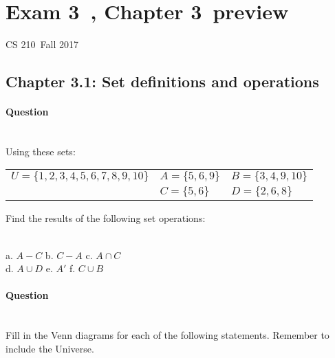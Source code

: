 \documentclass[a4paper,12pt]{book} \usepackage[utf8]{inputenc} \title{} \author{Rachel Morris} \date{\today}
\newcommand{\laClass}{CS 210\ } \newcommand{\laSemester}{Fall 2017\ }
\newcommand{\laChapter}{Chapter 3\ } \newcommand{\laExam}{Exam 3\ }
\newcounter{question}
\begin{document}
    \section*{\laExam, \laChapter preview}

    \laClass \laSemester{}

    \subsection*{Chapter 3.1: Set definitions and operations}

    \paragraph{Question \thequestion} ~\\
        Using these sets:

        \begin{center}
            \begin{tabular}{p{6cm} p{4cm} p{4cm} }
                $U = \{ 1, 2, 3, 4, 5, 6, 7, 8, 9, 10 \}$
                & $A = \{ 5, 6, 9 \}$
                & $B = \{ 3, 4, 9, 10 \}$
                \\
                & $C = \{ 5, 6 \}$
                & $D = \{ 2, 6, 8 \}$
            \end{tabular}
        \end{center}

        Find the results of the following set operations:

            ~\\
            a.   $A - C$        \tab
            b.   $C - A$        \tab
            c.   $A \cap C$     \\
            d.   $A \cup D$     \tab
            e.   $A'$           \tab[1.7cm]
            f.   $C \cup B$

    \paragraph{Question \thequestion} ~\\

        Fill in the Venn diagrams for each of the following statements.
        Remember to include the Universe.
        ~\\
\end{document}
